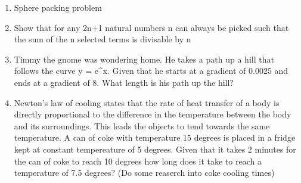 \documentclass[a4paper]{article}
\begin{document}
\begin{enumerate}
\item
Sphere packing problem

\item
Show that for any 2n+1 natural numbers n can always be picked such that the sum of the n selected terms is divisable by n

\item
Timmy the gnome was wondering home. He takes a path up a hill that follows the curve y = e^x. Given that he starts at a gradient of 0.0025 and ends at a gradient of 8. What length is his path up the hill?

\item
Newton's law of cooling states that the rate of heat transfer of a body is directly proportional to the difference in the temperature between the body and its surroundings. This leads the objects to tend towards the same temperature. A can of coke with 
temperature 15 degrees is placed in a fridge kept at constant tempereature of 5 degrees. Given that it takes 2 minutes for the can of coke to reach 10 degrees how long does it take to reach a temperature of 7.5 degrees? (Do some reaserch into coke cooling times)

\end{enumerate}
\end{document}
